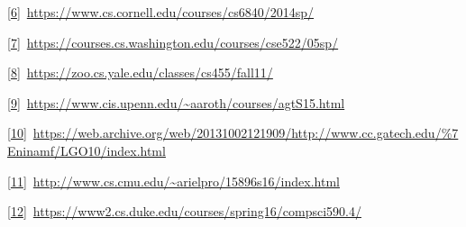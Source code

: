 \documentclass[]{article}
\begin{document}
\protect\hyperlink{ftnt_ref6}{{[}6{]}}{~}{\href{https://www.google.com/url?q=https://www.cs.cornell.edu/courses/cs6840/2014sp/\&sa=D\&ust=1522867200383000}{https://www.cs.cornell.edu/courses/cs6840/2014sp/}}

\protect\hyperlink{ftnt_ref7}{{[}7{]}}{~}{\href{https://www.google.com/url?q=https://courses.cs.washington.edu/courses/cse522/05sp/\&sa=D\&ust=1522867200383000}{https://courses.cs.washington.edu/courses/cse522/05sp/}}

\protect\hyperlink{ftnt_ref8}{{[}8{]}}{~}{\href{https://www.google.com/url?q=https://zoo.cs.yale.edu/classes/cs455/fall11/\&sa=D\&ust=1522867200384000}{https://zoo.cs.yale.edu/classes/cs455/fall11/}}

\protect\hyperlink{ftnt_ref9}{{[}9{]}}{~}{\href{https://www.google.com/url?q=https://www.cis.upenn.edu/~aaroth/courses/agtS15.html\&sa=D\&ust=1522867200384000}{https://www.cis.upenn.edu/\textasciitilde{}aaroth/courses/agtS15.html}}

\protect\hyperlink{ftnt_ref10}{{[}10{]}}{~}{\href{https://www.google.com/url?q=https://web.archive.org/web/20131002121909/http://www.cc.gatech.edu/\%257Eninamf/LGO10/index.html\&sa=D\&ust=1522867200384000}{https://web.archive.org/web/20131002121909/http://www.cc.gatech.edu/\%7Eninamf/LGO10/index.html}}

\protect\hyperlink{ftnt_ref11}{{[}11{]}}{~}{\href{https://www.google.com/url?q=http://www.cs.cmu.edu/~arielpro/15896s16/index.html\&sa=D\&ust=1522867200385000}{http://www.cs.cmu.edu/\textasciitilde{}arielpro/15896s16/index.html}}

\protect\hyperlink{ftnt_ref12}{{[}12{]}}{~}{\href{https://www.google.com/url?q=https://www2.cs.duke.edu/courses/spring16/compsci590.4/\&sa=D\&ust=1522867200385000}{https://www2.cs.duke.edu/courses/spring16/compsci590.4/}}
\end{document}
